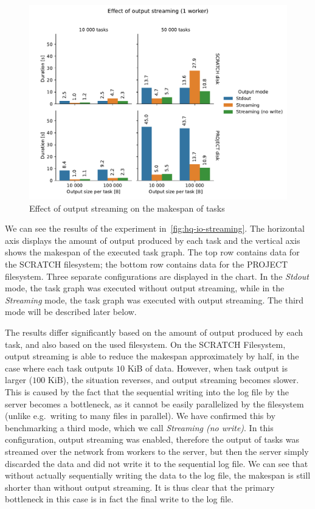 \begin{figure}[h]
	\centering
	\includegraphics[width=\textwidth]{imgs/hq/charts/io-streaming}
	\caption{Effect of output streaming on the makespan of tasks}
	\label{fig:hq-io-streaming}
\end{figure}

We can see the results of the experiment in~\autoref{fig:hq-io-streaming}. The horizontal axis displays
the amount of output produced by each task and the vertical axis shows the makespan of the executed
task graph. The top row contains data for the SCRATCH filesystem; the bottom row contains data for
the PROJECT filesystem. Three separate configurations are displayed in the chart. In the
\emph{Stdout} mode, the task graph was executed without output streaming, while in the
\emph{Streaming} mode, the task graph was executed with output streaming. The third mode
will be described later below.

The results differ significantly based on the amount of output produced by each task, and also
based on the used filesystem. On the SCRATCH Filesystem, output streaming is able to reduce the
makespan approximately by half, in the case where each task outputs $10$ KiB of
data. However, when task output is larger ($100$ KiB), the situation reverses,
and output streaming becomes slower. This is caused by the fact that the sequential writing into
the log file by the server becomes a bottleneck, as it cannot be easily parallelized by the
filesystem (unlike e.g.\ writing to many files in parallel). We have confirmed this by benchmarking
a third mode, which we call \emph{Streaming (no write)}. In this configuration, output streaming was
enabled, therefore the output of tasks was streamed over the network from workers to the server,
but then the server simply discarded the data and did not write it to the sequential log file. We
can see that without actually sequentially writing the data to the log file, the makespan is still
shorter than without output streaming. It is thus clear that the primary bottleneck in this case is
in fact the final write to the log file.

